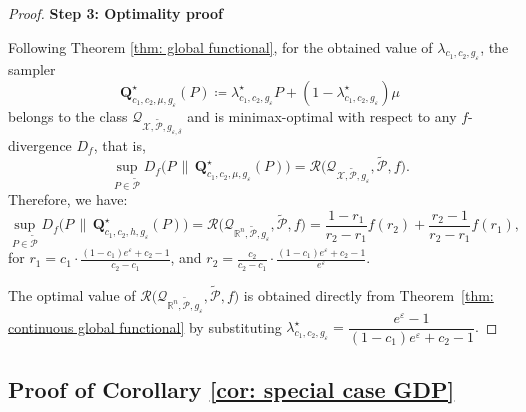 \documentclass[accepted]{article}
\theoremstyle{plain} %
\theoremstyle{definition}
\theoremstyle{remark}
\newcommand{\eps}{\varepsilon}
\newcommand{\bQ}{\mathbf{Q}}
\begin{document}
\begin{proof}
\textbf{Step 3: Optimality proof}



Following Theorem \ref{thm: global functional}, for the obtained value of $\lambda_{c_1,c_2,g_{\eps}}$, 
the sampler \begin{equation*}
    \bQ^\star_{c_1,c_2,\mu,g_{\varepsilon}}(P) \coloneqq \lambda^\star_{c_1,c_2,g_{\varepsilon}} P + (1 - \lambda^\star_{c_1,c_2,g_{\varepsilon}})\mu
\end{equation*}
belongs to the class $\mathcal{Q}_{\mathcal{X}, \tilde{\mathcal{P}}, g_{\varepsilon,\delta}}$ and is minimax-optimal with respect to any $f$-divergence $D_f$, that is,
\begin{equation*}
    \sup_{P \in \tilde{\mathcal{P}}} D_f\big(P \, \| \, \bQ^\star_{c_1,c_2,\mu,g_{\varepsilon}}(P)\big)
    = \mathcal{R}\big(\mathcal{Q}_{\mathcal{X}, \tilde{\mathcal{P}}, g_{\varepsilon}}, \tilde{\mathcal{P}}, f\big).
\end{equation*}
Therefore, we have:
\begin{equation*}
    \sup_{P \in \tilde{\mathcal{P}}} D_f\big(P \,\|\, \bQ^\star_{c_1,c_2,h,g_\eps}(P)\big)
    = \mathcal{R}\big(\mathcal{Q}_{\mathbb{R}^n, \tilde{\mathcal{P}}, g_\eps}, \tilde{\mathcal{P}}, f\big)
    = \frac{1 - r_1}{r_2 - r_1} f(r_2) + \frac{r_2 - 1}{r_2 - r_1} f(r_1),
\end{equation*}
for $
r_1 = c_1 \cdot \frac{(1 - c_1)e^{\eps} + c_2 - 1}{c_2 - c_1 }$, and $
r_2 = \frac{c_2}{c_2 - c_1} \cdot \frac{(1 - c_1)e^{\eps} + c_2 - 1}{e^{\eps}}$.

The optimal value of 
\(\mathcal{R}\bigl(\mathcal{Q}_{\mathbb{R}^n,\tilde{\mathcal{P}},g_\varepsilon},
                    \tilde{\mathcal{P}},f\bigr)\)
is obtained directly from
Theorem~\ref{thm: continuous global functional}
by substituting
\(
\lambda_{c_1,c_2,g_\varepsilon}^{\star}
      =\dfrac{e^{\varepsilon}-1}{(1-c_1)e^{\varepsilon}+c_2-1}.
\)

\end{proof}




\subsection{Proof of Corollary \ref{cor: special case GDP}}\label{proof: GDP}
\end{document}
